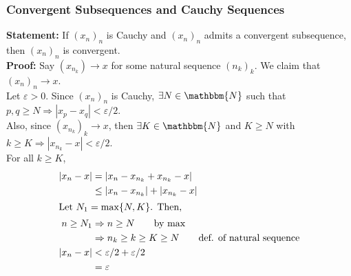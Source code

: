 \documentclass[10pt]{extarticle}
\newcommand{\N}{\mathbbm{N}}
\begin{document}
    \subsubsection{Convergent Subsequences and Cauchy Sequences}%
    \textbf{Statement:} If $(x_n)_n$ is Cauchy and $(x_n)_n$ admits a convergent subsequence, then $(x_n)_n$ is convergent.\\

    \textbf{Proof:} Say $(x_{n_k})\rightarrow x$ for some natural sequence $(n_k)_k$. We claim that $(x_n)_n\rightarrow x$.\\

      Let $\varepsilon > 0$. Since $(x_n)_n$ is Cauchy, $\exists N\in\N$ such that $p,q\geq N \Rightarrow |x_p-x_q| < \varepsilon/2$.\\

      Also, since $(x_{n_k})_k \rightarrow x$, then $\exists K\in\N$ and $K\geq N$ with $k\geq K \Rightarrow |x_{n_k} - x| < \varepsilon/2$.\\

      For all $k\geq K$,
      \begin{align*}
        |x_n - x| &= |x_n - x_{n_k} + x_{n_k} - x|\\
                  &\leq |x_n - x_{n_k}| + |x_{n_k} - x|\\
        \shortintertext{Let $N_1 = \max\{N,K\}$. Then,}
        n \geq N_1 &\Rightarrow n\geq N \tag*{by $\max$}\\
                   &\Rightarrow n_k \geq k \geq K \geq N \tag*{def. of natural sequence}\\
        |x_n - x| &< \varepsilon/2 + \varepsilon/2\\
                  &= \varepsilon
      \end{align*}
\end{document}
